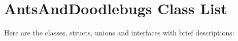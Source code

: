 \section{Ants\-And\-Doodlebugs Class List}
Here are the classes, structs, unions and interfaces with brief descriptions:\begin{CompactList}
\item{}
\item{}
\end{CompactList}
